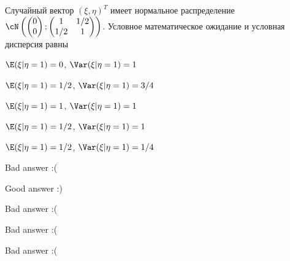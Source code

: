 
\begin{question}
Случайный вектор \((\xi, \eta)^T\) имеет нормальное распределение
\(\cN \left( \begin{pmatrix} 0 \\ 0 \end{pmatrix}; \begin{pmatrix} 1 & 1/2 \\ 1/2 & 1 \end{pmatrix} \right)\).
Условное математическое ожидание и условная дисперсия равны
\begin{answerlist}
  \item \(\E(\xi | \eta=1)=0\), \(\Var(\xi | \eta=1)=1\)
  \item \(\E(\xi | \eta=1)=1/2\), \(\Var(\xi | \eta=1)=3/4\)
  \item \(\E(\xi | \eta=1)=1\), \(\Var(\xi | \eta=1)=1\)
  \item \(\E(\xi | \eta=1)=1/2\), \(\Var(\xi | \eta=1)=1\)
  \item \(\E(\xi | \eta=1)=1/2\), \(\Var(\xi | \eta=1)=1/4\)
\end{answerlist}
\end{question}

\begin{solution}
\begin{answerlist}
  \item Bad answer :(
  \item Good answer :)
  \item Bad answer :(
  \item Bad answer :(
  \item Bad answer :(
\end{answerlist}
\end{solution}

